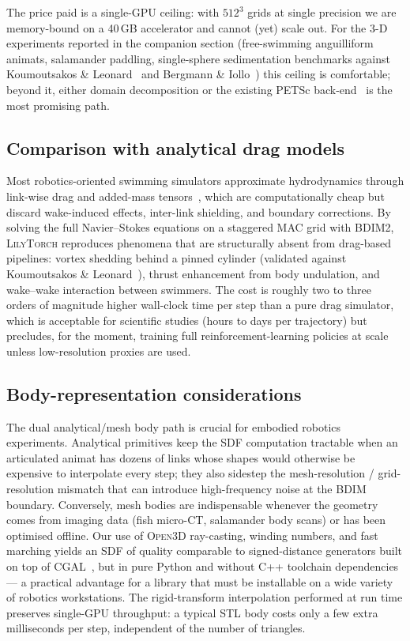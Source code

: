 \documentclass[journal,twoside,10pt]{IEEEtran}
\newcommand{\lilytorch}{\textsc{LilyTorch}\xspace}
\begin{document}
The price paid is a single-GPU ceiling: with $512^3$ grids at single
precision we are memory-bound on a 40\,GB accelerator and cannot
(yet) scale out.  For the 3-D experiments reported in the companion
section (free-swimming anguilliform animats, salamander paddling,
single-sphere sedimentation benchmarks against
Koumoutsakos \& Leonard~\cite{koumoutsakos1995high} and
Bergmann \& Iollo~\cite{bergmann2011accurate}) this ceiling is
comfortable; beyond it, either domain decomposition or the existing
PETSc back-end~\cite{balay2019petsc} is the most promising path.


\subsection{Comparison with analytical drag models}

Most robotics-oriented swimming simulators approximate hydrodynamics
through link-wise drag and added-mass
tensors~\cite{porez2014improved}, which are computationally cheap but
discard wake-induced effects, inter-link shielding, and boundary
corrections.  By solving the full Navier--Stokes equations on a
staggered MAC grid with BDIM2, \lilytorch reproduces phenomena that
are structurally absent from drag-based pipelines: vortex shedding
behind a pinned cylinder (validated against
Koumoutsakos \& Leonard~\cite{koumoutsakos1995high}), thrust
enhancement from body undulation, and wake--wake interaction between
swimmers.  The cost is roughly two to three orders of magnitude
higher wall-clock time per step than a pure drag simulator, which is
acceptable for scientific studies (hours to days per trajectory) but
precludes, for the moment, training full reinforcement-learning
policies at scale unless low-resolution proxies are used.


\subsection{Body-representation considerations}

The dual analytical/mesh body path is crucial for embodied robotics
experiments.  Analytical primitives keep the SDF computation
tractable when an articulated animat has dozens of links whose
shapes would otherwise be expensive to interpolate every step; they
also sidestep the mesh-resolution / grid-resolution mismatch that
can introduce high-frequency noise at the BDIM boundary.  Conversely,
mesh bodies are indispensable whenever the geometry comes from
imaging data (fish micro-CT, salamander body scans) or has been
optimised offline.  Our use of \textsc{Open3D} ray-casting, winding
numbers, and fast marching yields an SDF of quality comparable to
signed-distance generators built on top of
\textsc{CGAL}~\cite{alliez2009cgal}, but in pure Python and without
C++ toolchain dependencies --- a practical advantage for a library
that must be installable on a wide variety of robotics workstations.
The rigid-transform interpolation performed at run time preserves
single-GPU throughput: a typical STL body costs only a few extra
milliseconds per step, independent of the number of triangles.
\end{document}

